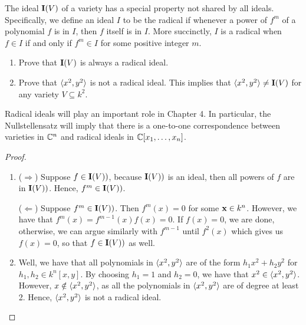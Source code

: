 \begin{exercise}{8}
The ideal $\mathbf{I}(V)$ of a variety has a special property not shared by all ideals. 
Specifically, we define an ideal $I$ to be the radical if whenever a power of $f^m$ of a polynomial $f$ is in $I$, then $f$ itself is in $I$. 
More succinctly, $I$ is a radical when $f\in I$ if and only if $f^m\in I$ for some positive integer $m$.
\begin{enumerate}
    \item Prove that $\mathbf{I}(V)$ is always a radical ideal.
    \item Prove that $\langle x^2,y^2\rangle$ is not a radical ideal. 
    This implies that $\langle x^2,y^2\rangle\neq \mathbf{I}(V)$ for any variety $V\subseteq k^2$.
\end{enumerate}
Radical ideals will play an important role in Chapter 4. 
In particular, the Nullstellensatz will imply that there is a one-to-one correspondence between varieties in $\mathbb{C}^n$ and radical ideals in $\mathbb{C}[x_1,\dots,x_n]$.
\end{exercise}
\begin{proof}
\begin{enumerate}
    \item ($\Rightarrow$) 
    Suppose $f\in\mathbf{I}(V))$, because $\mathbf{I}(V))$ is an ideal, then all powers of $f$ are in $\mathbf{I}(V))$. 
    Hence, $f^m\in\mathbf{I}(V))$.

    ($\Leftarrow$) 
    Suppose $f^m\in\mathbf{I}(V))$. 
    Then $f^m(x)=0$ for some $\mathbf{x}\in k^n$. 
    However, we have that $f^m(x) = f^{m-1}(x)f(x) = 0$. 
    If $f(x)=0$, we are done, otherwise, we can argue similarly with $f^{m-1}$ until $f^2(x)$ which gives us $f(x)=0$, so that $f\in\mathbf{I}(V))$ as well.
    \item Well, we have that all polynomials in $\langle x^2,y^2\rangle$ are of the form $h_1x^2+h_2y^2$ for $h_1,h_2\in k^n[x,y]$. 
    By choosing $h_1=1$ and $h_2=0$, we have that $x^2\in\langle x^2,y^2\rangle$. 
    However, $x\notin\langle x^2,y^2\rangle$, as all the polynomials in $\langle x^2,y^2\rangle$ are of degree at least 2. 
    Hence, $\langle x^2,y^2\rangle$ is not a radical ideal.
\end{enumerate}
\end{proof}

